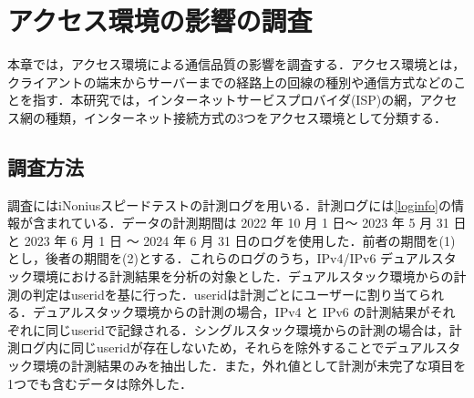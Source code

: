 
\chapter{アクセス環境の影響の調査}
本章では，アクセス環境による通信品質の影響を調査する．アクセス環境とは，クライアントの端末からサーバーまでの経路上の回線の種別や通信方式などのことを指す．本研究では，インターネットサービスプロバイダ(ISP)の網，アクセス網の種類，インターネット接続方式の3つをアクセス環境として分類する．
\section{調査方法}
調査にはiNoniusスピードテストの計測ログを用いる．計測ログには\cref{loginfo}の情報が含まれている．データの計測期間は 2022 年 10 月 1 日〜 2023 年 5 月 31 日と 2023 年 6 月 1 日 〜 2024 年 6 月 31 日のログを使用した．前者の期間を(1)とし，後者の期間を(2)とする．これらのログのうち，IPv4/IPv6 デュアルスタック環境における計測結果を分析の対象とした．デュアルスタック環境からの計測の判定はuseridを基に行った．useridは計測ごとにユーザーに割り当てられる．デュアルスタック環境からの計測の場合，IPv4 と IPv6 の計測結果がそれぞれに同じuseridで記録される．シングルスタック環境からの計測の場合は，計測ログ内に同じuseridが存在しないため，それらを除外することでデュアルスタック環境の計測結果のみを抽出した．また，外れ値として計測が未完了な項目を1つでも含むデータは除外した．


